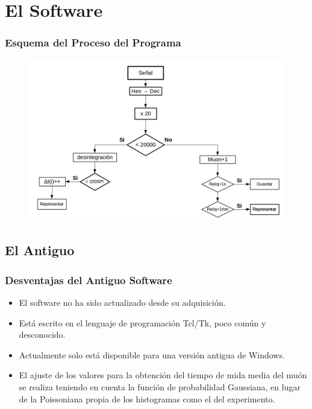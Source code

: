 \documentclass[xcolor=dvipsnames]{beamer}
\begin{document}
		\section{El Software}

			\begin{frame}
				\frametitle{Esquema del Proceso del Programa}
				\begin{figure}[H]
					\centering
					\includegraphics[scale=0.3]{Fotos/Esquema.png}
				\end{figure}
			\end{frame}

		\subsection{El Antiguo}

			\begin{frame}
				\frametitle{Desventajas del Antiguo Software}

					\begin{itemize}
						\item<1-> El software no ha sido actualizado desde su adquisición.

						\item<2-> Está escrito en el lenguaje de programación Tcl/Tk, poco común y desconocido.

						\item<3-> Actualmente solo está disponible para una versión antigua de Windows.

						\item<4-> El ajuste de los valores para la obtención del tiempo de mida media del muón se realiza teniendo en cuenta la función de probabilidad Gaussiana, en lugar de la Poissoniana propia de los histogramas como el del experimento.
					\end{itemize}
			\end{frame}
\end{document}
